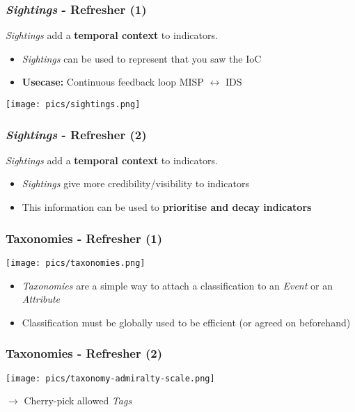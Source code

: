 \begin{frame}
    \frametitle{\textit{Sightings} - Refresher (1)}
    \textit{Sightings} add a \textbf{temporal context} to indicators.
    \begin{itemize}
        \item \textit{Sightings} can be used to represent that you saw the IoC
        \item \textbf{Usecase:} Continuous feedback loop MISP $\leftrightarrow$ IDS
    \end{itemize}

    \begin{center}
        \texttt{[image: pics/sightings.png]}
    \end{center}
\end{frame}

\begin{frame}
    \frametitle{\textit{Sightings} - Refresher (2)}
    \textit{Sightings} add a \textbf{temporal context} to indicators.
    \begin{itemize}
        \item \textit{Sightings} give more credibility/visibility to indicators
        \item This information can be used to {\bf prioritise and decay indicators}
    \end{itemize}
\end{frame}

\begin{frame}
    \frametitle{Taxonomies - Refresher (1)}
    \texttt{[image: pics/taxonomies.png]}
    \begin{itemize}
        \item \textit{Taxonomies} are a simple way to attach a classification to an \textit{Event} or an \textit{Attribute}
        \item Classification must be globally used to be efficient (or agreed on beforehand)
    \end{itemize}
\end{frame}

\begin{frame}
    \frametitle{Taxonomies - Refresher (2)}
    \texttt{[image: pics/taxonomy-admiralty-scale.png]}
    \begin{center}
        $\rightarrow$ Cherry-pick allowed \textit{Tags}
    \end{center}
\end{frame}

